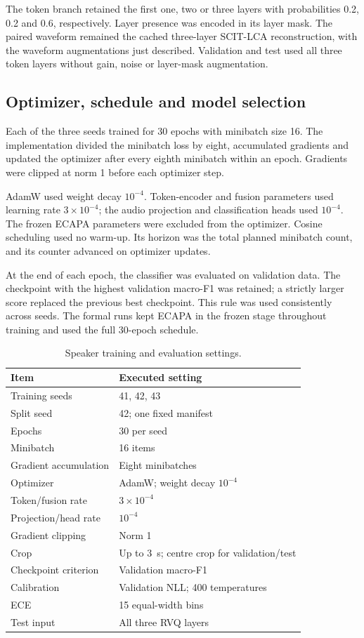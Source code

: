 The token branch retained the first one, two or three layers with probabilities 0.2, 0.2 and 0.6, respectively. Layer presence was encoded in its layer mask. The paired waveform remained the cached three-layer SCIT-LCA reconstruction, with the waveform augmentations just described. Validation and test used all three token layers without gain, noise or layer-mask augmentation.

\subsection{Optimizer, schedule and model selection}
Each of the three seeds trained for 30 epochs with minibatch size 16. The implementation divided the minibatch loss by eight, accumulated gradients and updated the optimizer after every eighth minibatch within an epoch. Gradients were clipped at norm 1 before each optimizer step.

AdamW used weight decay $10^{-4}$. Token-encoder and fusion parameters used learning rate $3\times10^{-4}$; the audio projection and classification heads used $10^{-4}$. The frozen ECAPA parameters were excluded from the optimizer. Cosine scheduling used no warm-up. Its horizon was the total planned minibatch count, and its counter advanced on optimizer updates.

At the end of each epoch, the classifier was evaluated on validation data. The checkpoint with the highest validation macro-F1 was retained; a strictly larger score replaced the previous best checkpoint. This rule was used consistently across seeds. The formal runs kept ECAPA in the frozen stage throughout training and used the full 30-epoch schedule.

\begin{table}[t]
\centering
\caption{Speaker training and evaluation settings.}
\label{tab:sv2-speaker-settings}
\small
\begin{tabularx}{\columnwidth}{@{}lY@{}}
\toprule
Item & Executed setting\\
\midrule
Training seeds & 41, 42, 43\\
Split seed & 42; one fixed manifest\\
Epochs & 30 per seed\\
Minibatch & 16 items\\
Gradient accumulation & Eight minibatches\\
Optimizer & AdamW; weight decay $10^{-4}$\\
Token/fusion rate & $3\times10^{-4}$\\
Projection/head rate & $10^{-4}$\\
Gradient clipping & Norm 1\\
Crop & Up to 3~s; centre crop for validation/test\\
Checkpoint criterion & Validation macro-F1\\
Calibration & Validation NLL; 400 temperatures\\
ECE & 15 equal-width bins\\
Test input & All three RVQ layers\\
\bottomrule
\end{tabularx}
\end{table}

